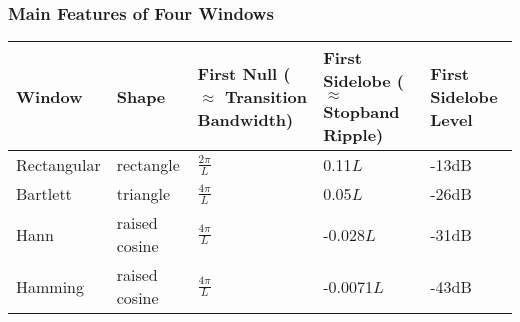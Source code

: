 \documentclass{beamer}
\begin{document}
\begin{frame}
  \frametitle{Main Features of Four Windows}

  \begin{center}
    \begin{tabular}{|p{}|p{}|p{}|p{}|p{}|}\hline
      Window & Shape & First Null ($\approx$ Transition Bandwidth) &
      First Sidelobe ($\approx$ Stopband Ripple) & First Sidelobe Level
      \\\hline\hline
      Rectangular & rectangle & $\frac{2\pi}{L}$ & 0.11$L$ & -13dB \\\hline
      Bartlett & triangle & $\frac{4\pi}{L}$ & 0.05$L$ & -26dB\\\hline
      Hann & raised cosine & $\frac{4\pi}{L}$ & -0.028$L$ & -31dB \\\hline
      Hamming & raised cosine & $\frac{4\pi}{L}$ & -0.0071$L$ & -43dB\\\hline
    \end{tabular}
  \end{center}
\end{frame}
\end{document}
